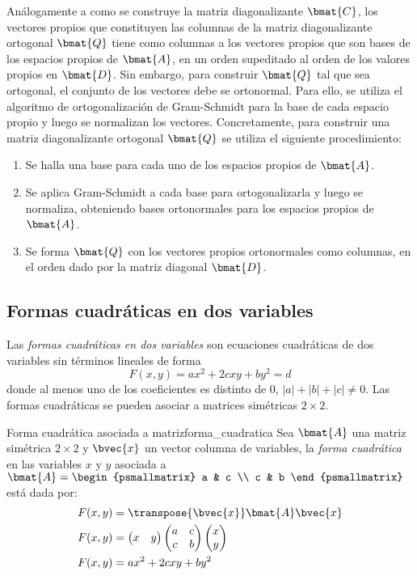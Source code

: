 \documentclass{fmbnotes}
\begin{document}
Análogamente a como se construye la matriz diagonalizante \(\bmat{C}\), los vectores propios que constituyen las columnas de la matriz diagonalizante ortogonal \(\bmat{Q}\) tiene como columnas a los vectores propios que son bases de los espacios propios de \(\bmat{A}\), en un orden supeditado al orden de los valores propios en \(\bmat{D}\). Sin embargo, para construir  \(\bmat{Q}\) tal que sea ortogonal, el conjunto de los vectores debe se ortonormal. Para ello, se utiliza el algoritmo de ortogonalización de Gram-Schmidt para la base de cada espacio propio y luego se normalizan los vectores. Concretamente, para construir una matriz diagonalizante ortogonal \(\bmat{Q}\) se utiliza el siguiente procedimiento: 
\begin{enumerate}
	\item Se halla una base para cada uno de los espacios propios de \(\bmat{A}\). 
	\item Se aplica Gram-Schmidt a cada base para ortogonalizarla y luego se normaliza, obteniendo bases ortonormales para los espacios propios de \(\bmat{A}\). 
	\item Se forma \(\bmat{Q}\) con los vectores propios ortonormales como columnas, en el orden dado por la matriz diagonal \(\bmat{D}\).
\end{enumerate}

\subsection{Formas cuadráticas en dos variables}

Las \emph{formas cuadráticas en dos variables} son ecuaciones cuadráticas de dos variables sin términos lineales de forma 
\[F(x,y)=ax^2+2cxy+by^2=d\]
donde al menos uno de los coeficientes es distinto de 0, \(\left|a\right|+\left|b\right|+\left|c\right|\neq0\). Las formas cuadráticas se pueden asociar a matrices simétricas \(2\times 2\).

\begin{definicion}{Forma cuadrática asociada a matriz}{forma_cuadratica}
	Sea \(\bmat{A}\) una matriz simétrica \(2\times 2\) y \(\bvec{x}\) un vector columna de variables, la \emph{forma cuadrática} en las variables \(x\) y \(y\) asociada a \(\bmat{A}=\begin{psmallmatrix}
		a & c \\ c & b
		\end{psmallmatrix}\) está dada por: 
	\begin{align*}
		F(x,y)&=\transpose{\bvec{x}}\bmat{A}\bvec{x} \\
		F(x,y)&=\begin{pmatrix}
				x & y
			\end{pmatrix}\begin{pmatrix}
			a & c \\ c & b 
			\end{pmatrix}\begin{pmatrix}
			x \\ y
			\end{pmatrix}\\
		F(x,y)&=ax^2+2cxy+by^2
	\end{align*}
\end{definicion}
\end{document}
